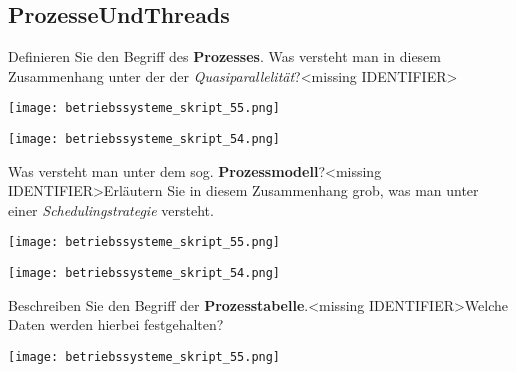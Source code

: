 \documentclass{article}
\begin{document}
\subsection{ProzesseUndThreads}
\begin{tcolorbox}[colback=white!10!white,colframe=lightgray!75!black,
  savelowerto=\jobname_ex.tex,breakable,enhanced,lines before break=40]

\justifying
Definieren Sie den Begriff des \textbf{Prozesses}. Was versteht man in diesem Zusammenhang unter der der \textit{Quasiparallelität}?<missing IDENTIFIER>

\tcblower

\justifying
\begin{center}
\texttt{[image: betriebssysteme\_skript\_55.png]}
\end{center}
\begin{center}
\texttt{[image: betriebssysteme\_skript\_54.png]}
\end{center}

\end{tcolorbox}
\begin{tcolorbox}[colback=white!10!white,colframe=lightgray!75!black,
  savelowerto=\jobname_ex.tex,breakable,enhanced,lines before break=40]

\justifying
Was versteht man unter dem sog. \textbf{Prozessmodell}?<missing IDENTIFIER>Erläutern Sie in diesem Zusammenhang grob, was man unter einer \textit{Schedulingstrategie} versteht.

\tcblower

\justifying
\begin{center}
\texttt{[image: betriebssysteme\_skript\_55.png]}
\end{center}
\begin{center}
\texttt{[image: betriebssysteme\_skript\_54.png]}
\end{center}

\end{tcolorbox}
\begin{tcolorbox}[colback=white!10!white,colframe=lightgray!75!black,
  savelowerto=\jobname_ex.tex,breakable,enhanced,lines before break=40]

\justifying
Beschreiben Sie den Begriff der \textbf{Prozesstabelle}.<missing IDENTIFIER>Welche Daten werden hierbei festgehalten?

\tcblower

\justifying
\begin{center}
\texttt{[image: betriebssysteme\_skript\_55.png]}
\end{center}

\end{tcolorbox}
\end{document}

